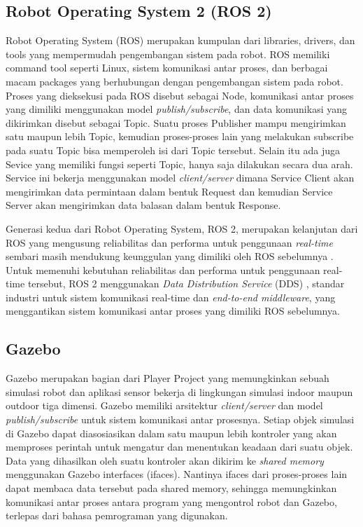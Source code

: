 \subsection{Robot Operating System 2 (ROS 2)}

Robot Operating System (ROS) \citep{Quigley2009} merupakan kumpulan dari libraries, drivers, dan tools yang mempermudah pengembangan sistem pada robot.
ROS memiliki command tool seperti Linux, sistem komunikasi antar proses, dan berbagai macam packages yang berhubungan dengan pengembangan sistem pada robot.
Proses yang dieksekusi pada ROS disebut sebagai Node, komunikasi antar proses yang dimiliki menggunakan model \emph{publish/subscribe}, dan data komunikasi yang dikirimkan disebut sebagai Topic.
Suatu proses Publisher mampu mengirimkan satu maupun lebih Topic, kemudian proses-proses lain yang melakukan subscribe pada suatu Topic bisa memperoleh isi dari Topic tersebut.
Selain itu ada juga Sevice yang memiliki fungsi seperti Topic, hanya saja dilakukan secara dua arah.
Service ini bekerja menggunakan model \emph{client/server} dimana Service Client akan mengirimkan data permintaan dalam bentuk Request dan kemudian Service Server akan mengirimkan data balasan dalam bentuk Response.

Generasi kedua dari Robot Operating System, ROS 2, merupakan kelanjutan dari ROS yang mengusung reliabilitas dan performa untuk penggunaan \emph{real-time} sembari masih mendukung keunggulan yang dimiliki oleh ROS sebelumnya \citep{Maruyama2016}.
Untuk memenuhi kebutuhan reliabilitas dan performa untuk penggunaan real-time tersebut, ROS 2 menggunakan \emph{Data Distribution Service} (DDS) \citep{Castellote2003} \citep{Schlesselman2004}, standar industri untuk sistem komunikasi real-time dan \emph{end-to-end middleware}, yang menggantikan sistem komunikasi antar proses yang dimiliki ROS sebelumnya.

\subsection{Gazebo}

Gazebo \citep{Koenig2004} merupakan bagian dari Player Project \citep{Gerkey2003} yang memungkinkan sebuah simulasi robot dan aplikasi sensor bekerja di lingkungan simulasi indoor maupun outdoor tiga dimensi.
Gazebo memiliki arsitektur \emph{client/server} dan model \emph{publish/subscribe} untuk sistem komunikasi antar prosesnya.
Setiap objek simulasi di Gazebo dapat diasosiasikan dalam satu maupun lebih kontroler yang akan memproses perintah untuk mengatur dan menentukan keadaan dari suatu objek.
Data yang dihasilkan oleh suatu kontroler akan dikirim ke \emph{shared memory} menggunakan Gazebo interfaces (ifaces).
Nantinya ifaces dari proses-proses lain dapat membaca data tersebut pada shared memory, sehingga memungkinkan komunikasi antar proses antara program yang mengontrol robot dan Gazebo, terlepas dari bahasa pemrograman yang digunakan.
